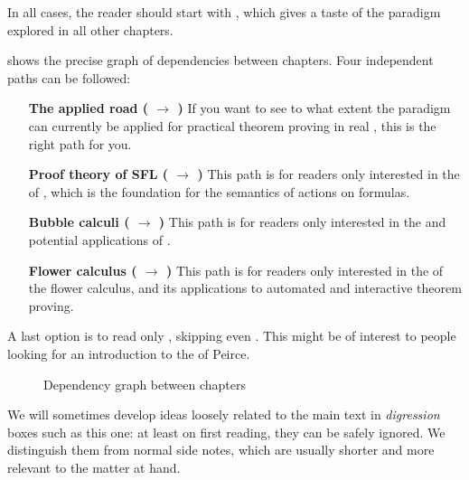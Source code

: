 \begin{emphpar}
  In all cases, the reader should start with , which gives a taste of
  the  paradigm explored in all other chapters.
\end{emphpar}

 shows the precise graph of dependencies between chapters.
Four independent paths can be followed:
\begin{itemize}
  \item[\textbf{The applied road (\ding{175} $\to$ \ding{177})}] If
  you want to see to what extent the  paradigm can currently be applied for
  practical theorem proving in real , this is the right path for
  you.

  \item[\textbf{Proof theory of SFL (\ding{174} $\to$ \ding{176})}]
  This path is for readers only interested in the  of , which is the foundation for the semantics of  actions on 
  formulas.

  \item[\textbf{Bubble calculi (\ding{178} $\to$ \ding{179})}]
  This path is for readers only interested in the  and potential
  applications of .
  
  \item[\textbf{Flower calculus (\ding{180} $\to$ \ding{181})}] This path is for
  readers only interested in the  of the flower calculus, and its
  applications to automated and interactive theorem proving.
\end{itemize}

A last option is to read only , skipping even . This might
be of interest to people looking for an introduction to the 
of Peirce.

\begin{figure*}
  \caption{Dependency graph between chapters}
\end{figure*}

\begin{digression}
  We will sometimes develop ideas loosely related to the main text in
  \emph{digression} boxes such as this one: at least on first reading, they can
  be safely ignored. We distinguish them from normal side notes, which are
  usually shorter and more relevant to the matter at hand.
\end{digression}

